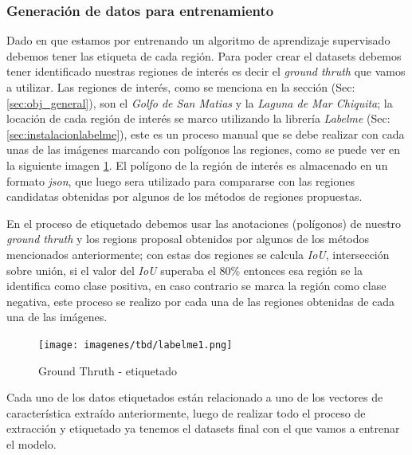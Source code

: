 

\subsubsection*{Generación de datos para entrenamiento}

Dado en que estamos por entrenando un algoritmo de aprendizaje supervisado debemos tener las etiqueta de cada región. Para poder crear el datasets debemos tener identificado nuestras regiones de interés es decir el \textit{ground thruth} que vamos a utilizar. Las regiones de interés, como se menciona en la sección (Sec:\ref{sec:obj_general}), son el \textit{Golfo de San Matias} y la \textit{Laguna de Mar Chiquita}; la locación de cada región de interés se marco utilizando la librería \textit{Labelme} (Sec:\ref{sec:instalacionlabelme}), este es un proceso manual que se debe realizar con cada unas de las imágenes marcando con polígonos las regiones, como se puede ver en la siguiente imagen \ref{Fig:labelme-etiquetado}. El polígono de la región de interés es almacenado en un formato \textit{json}, que luego sera utilizado para compararse con las regiones candidatas obtenidas por algunos de los métodos de regiones propuestas. 


En el proceso de etiquetado debemos usar las anotaciones (polígonos) de nuestro \textit{ground thruth} y los regions proposal obtenidos por algunos de los métodos mencionados anteriormente; con estas dos regiones se calcula \textit{IoU}, intersección sobre unión, si el valor del \textit{IoU} superaba el 80\% entonces esa región se la identifica como clase positiva, en caso contrario se marca la región como clase negativa, este proceso se realizo por cada una de las regiones obtenidas de cada una de las imágenes.


\begin{figure}[H] \centering
  \texttt{[image: imagenes/tbd/labelme1.png]}
  \caption{Ground Thruth - etiquetado}\label{Fig:labelme-etiquetado}
\end{figure}

Cada uno de los datos etiquetados están relacionado a uno de los vectores de característica extraído anteriormente, luego de realizar todo el proceso de extracción y etiquetado ya tenemos el datasets final con el que vamos a entrenar el modelo.



